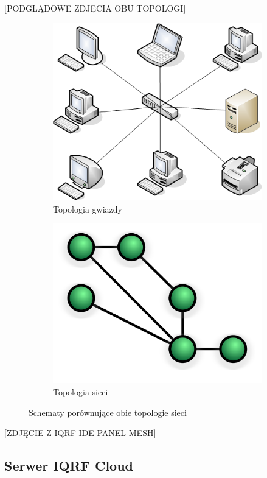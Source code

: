 \documentclass[a4paper, 12pt]{article}
\begin{document}
[PODGLĄDOWE ZDJĘCIA OBU TOPOLOGI]
\begin{figure}

\centering
\begin{subfigure}{0.4\textwidth}
    \centering
    \includegraphics[width=0.8\linewidth]{zdj/star-top.png}
    \caption{Topologia gwiazdy \cite{fig-star-top}}
\end{subfigure}
\begin{subfigure}{0.4\textwidth}
    \centering
    \includegraphics[width=0.8\linewidth]{zdj/mesh-top.png}
    \caption{Topologia sieci \cite{fig-mesh-top}}
\end{subfigure}
   
\caption{Schematy porównujące obie topologie sieci}

\end{figure}

[ZDJĘCIE Z IQRF IDE PANEL MESH]

\subsection{Serwer IQRF Cloud}
\end{document}
